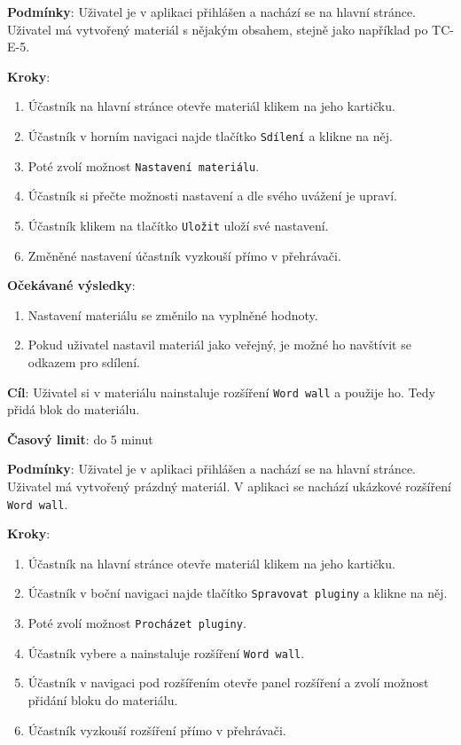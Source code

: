 \textbf{Podmínky}:  Uživatel je v aplikaci přihlášen a nachází se na hlavní stránce.  Uživatel má vytvořený materiál s nějakým obsahem, stejně jako například po TC-E-5.

\textbf{Kroky}:

\begin{enumerate}[leftmargin=1.4cm]
    \item Účastník na hlavní stránce otevře materiál klikem na jeho kartičku.
    \item Účastník v horním navigaci najde tlačítko \verb|Sdílení| a klikne na něj.
    \item Poté zvolí možnost \verb|Nastavení materiálu|.
    \item Účastník si přečte možnosti nastavení a dle svého uvážení je upraví. 
    \item Účastník klikem na tlačítko \verb|Uložit| uloží své nastavení.
    \item Změněné nastavení účastník vyzkouší přímo v přehrávači.
\end{enumerate}

\textbf{Očekávané výsledky}:

\begin{enumerate}[leftmargin=1.4cm]
    \item Nastavení materiálu se změnilo na vyplněné hodnoty.
    \item Pokud uživatel nastavil materiál jako veřejný, je možné ho navštívit se odkazem pro sdílení.
\end{enumerate}




\vspace{1em}

\textbf{Cíl}: Uživatel si v materiálu nainstaluje rozšíření \verb|Word wall| a použije ho. Tedy přidá blok do materiálu.

\textbf{Časový limit}: do 5 minut

\textbf{Podmínky}:  Uživatel je v aplikaci přihlášen a nachází se na hlavní stránce.  Uživatel má vytvořený prázdný materiál. V aplikaci se nachází ukázkové rozšíření \verb|Word wall|.

\textbf{Kroky}:

\begin{enumerate}[leftmargin=1.4cm]
    \item Účastník na hlavní stránce otevře materiál klikem na jeho kartičku.
    \item Účastník v boční navigaci najde tlačítko \verb|Spravovat pluginy| a klikne na něj.
    \item Poté zvolí možnost \verb|Procházet pluginy|.
    \item Účastník vybere a nainstaluje rozšíření \verb|Word wall|.
    \item Účastník v navigaci pod rozšířením otevře panel rozšíření a zvolí možnost přidání bloku do materiálu.
    \item Účastník vyzkouší rozšíření přímo v přehrávači.
\end{enumerate}

